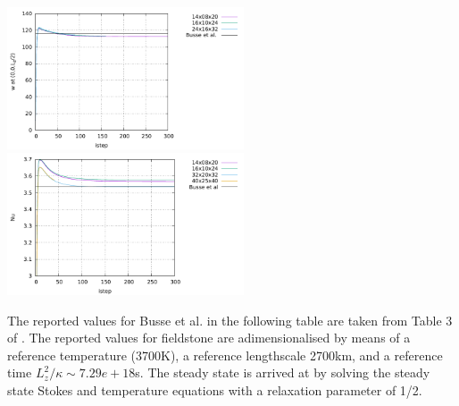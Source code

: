 \begin{center}
\includegraphics[width=7cm]{python_codes/fieldstone_20/images/wmid.pdf}
\includegraphics[width=7cm]{python_codes/fieldstone_20/images/Nu.pdf}
\end{center}


The reported values for Busse et al. in the following table are taken from Table 3 of \cite{bucc94}.
The reported values for fieldstone are adimensionalised by means of a reference temperature (3700K),
a reference lengthscale 2700km, and a reference time $L_z^2/\kappa\sim 7.29e+18$s.
The steady state is arrived at by solving the steady state Stokes and temperature equations 
with a relaxation parameter of 1/2.



